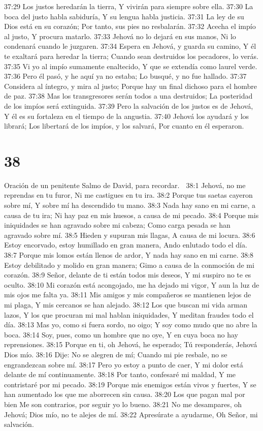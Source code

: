 37:29 Los justos heredarán la tierra, 
Y vivirán para siempre sobre ella. 
37:30 La boca del justo habla sabiduría, 
Y su lengua habla justicia. 
37:31 La ley de su Dios está en su corazón; 
Por tanto, sus pies no resbalarán. 
37:32 Acecha el impío al justo, 
Y procura matarlo. 
37:33 Jehová no lo dejará en sus manos, 
Ni lo condenará cuando le juzgaren. 
37:34 Espera en Jehová, y guarda su camino, 
Y él te exaltará para heredar la tierra; 
Cuando sean destruidos los pecadores, lo verás. 
37:35 Vi yo al impío sumamente enaltecido, 
Y que se extendía como laurel verde. 
37:36 Pero él pasó, y he aquí ya no estaba; 
Lo busqué, y no fue hallado. 
37:37 Considera al íntegro, y mira al justo; 
Porque hay un final dichoso para el hombre de paz. 
37:38 Mas los transgresores serán todos a una destruidos; 
La posteridad de los impíos será extinguida. 
37:39 Pero la salvación de los justos es de Jehová, 
Y él es su fortaleza en el tiempo de la angustia. 
37:40 Jehová los ayudará y los librará; 
Los libertará de los impíos, y los salvará, 
Por cuanto en él esperaron. 

\chapter{38}

Oración de un penitente 
Salmo de David, para recordar. 

38:1 Jehová, no me reprendas en tu furor, 
Ni me castigues en tu ira. 
38:2 Porque tus saetas cayeron sobre mí, 
Y sobre mí ha descendido tu mano. 
38:3 Nada hay sano en mi carne, a causa de tu ira; 
Ni hay paz en mis huesos, a causa de mi pecado. 
38:4 Porque mis iniquidades se han agravado sobre mi cabeza; 
Como carga pesada se han agravado sobre mí. 
38:5 Hieden y supuran mis llagas, 
A causa de mi locura. 
38:6 Estoy encorvado, estoy humillado en gran manera, 
Ando enlutado todo el día. 
38:7 Porque mis lomos están llenos de ardor, 
Y nada hay sano en mi carne. 
38:8 Estoy debilitado y molido en gran manera; 
Gimo a causa de la conmoción de mi corazón. 
38:9 Señor, delante de ti están todos mis deseos, 
Y mi suspiro no te es oculto. 
38:10 Mi corazón está acongojado, me ha dejado mi vigor, 
Y aun la luz de mis ojos me falta ya. 
38:11 Mis amigos y mis compañeros se mantienen lejos de mi plaga, 
Y mis cercanos se han alejado. 
38:12 Los que buscan mi vida arman lazos, 
Y los que procuran mi mal hablan iniquidades, 
Y meditan fraudes todo el día. 
38:13 Mas yo, como si fuera sordo, no oigo; 
Y soy como mudo que no abre la boca. 
38:14 Soy, pues, como un hombre que no oye, 
Y en cuya boca no hay reprensiones. 
38:15 Porque en ti, oh Jehová, he esperado; 
Tú responderás, Jehová Dios mío. 
38:16 Dije: No se alegren de mí; 
Cuando mi pie resbale, no se engrandezcan sobre mí. 
38:17 Pero yo estoy a punto de caer, 
Y mi dolor está delante de mí continuamente. 
38:18 Por tanto, confesaré mi maldad, 
Y me contristaré por mi pecado. 
38:19 Porque mis enemigos están vivos y fuertes, 
Y se han aumentado los que me aborrecen sin causa. 
38:20 Los que pagan mal por bien 
Me son contrarios, por seguir yo lo bueno. 
38:21 No me desampares, oh Jehová; 
Dios mío, no te alejes de mí. 
38:22 Apresúrate a ayudarme, 
Oh Señor, mi salvación. 

